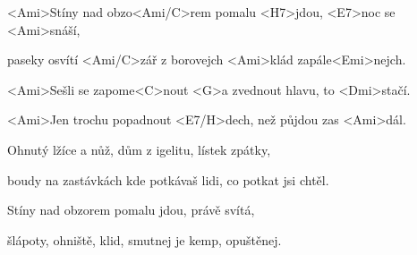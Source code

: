 

\zs
<Ami>Stíny nad obzo<Ami/C>rem pomalu <H7>jdou, <E7>noc se <Ami>snáší,

paseky osvítí <Ami/C>zář z borovejch <Ami>klád zapále<Emi>nejch.
\ks

\zr
<Ami>Sešli se zapome<C>nout <G>a zvednout hlavu, to <Dmi>stačí.

<Ami>Jen trochu popadnout <E7/H>dech, než půjdou zas <Ami>dál.
\kr

\zs
Ohnutý lžíce a nůž, dům z igelitu, lístek zpátky,

boudy na zastávkách kde potkávaš lidi, co potkat jsi chtěl.
\ks

\zr \kr

\zs
Stíny nad obzorem pomalu jdou, právě svítá,

šlápoty, ohniště, klid, smutnej je kemp, opuštěnej.
\ks

\zr \kr

\kp
